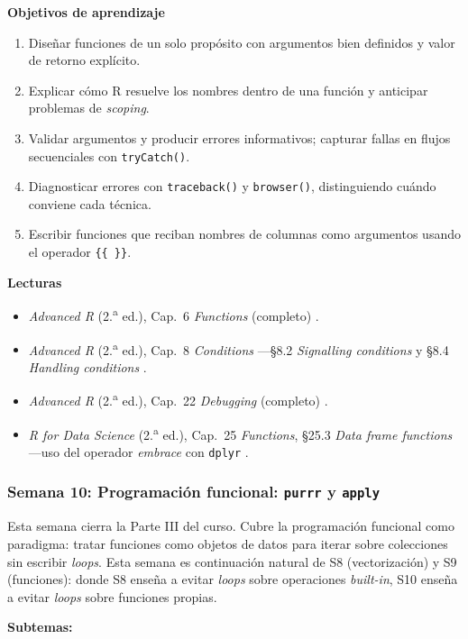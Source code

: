 \documentclass[11pt,letterpaper]{article}
\newcommand{\blue}[1]{{\color{cerulean}#1}}
\newcommand{\semana}[2]{%
  \subsubsection*{\color{main}Semana #1: #2}%
}
\begin{document}
\medskip
\noindent\textbf{Objetivos de aprendizaje}
\begin{enumerate}[leftmargin=*, itemsep=1pt]
    \item Diseñar funciones de un solo propósito con argumentos bien definidos y valor de retorno explícito.
    \item Explicar cómo R resuelve los nombres dentro de una función y anticipar problemas de \textit{scoping}.
    \item Validar argumentos y producir errores informativos; capturar fallas en flujos secuenciales con \texttt{tryCatch()}.
    \item Diagnosticar errores con \texttt{traceback()} y \texttt{browser()}, distinguiendo cuándo conviene cada técnica.
    \item Escribir funciones que reciban nombres de columnas como argumentos usando el operador \texttt{\{\{~\}\}}.
\end{enumerate}

\medskip
\noindent\textbf{Lecturas}
\begin{itemize}[leftmargin=*, itemsep=1pt]
    \item \textit{Advanced R} (2.\textsuperscript{a} ed.), Cap.\ 6 \textit{Functions} (completo) \cite{wickham2019advr}.
    \item \textit{Advanced R} (2.\textsuperscript{a} ed.), Cap.\ 8 \textit{Conditions} ---§8.2 \textit{Signalling conditions} y §8.4 \textit{Handling conditions} \cite{wickham2019advr}.
    \item \textit{Advanced R} (2.\textsuperscript{a} ed.), Cap.\ 22 \textit{Debugging} (completo) \cite{wickham2019advr}.
    \item \textit{R for Data Science} (2.\textsuperscript{a} ed.), Cap.\ 25 \textit{Functions}, §25.3 \textit{Data frame functions} ---uso del operador \textit{embrace} con \texttt{dplyr} \cite{wickham2023r4ds}.
\end{itemize}

\semana{10}{Programación funcional: \texttt{purrr} y \texttt{apply}}

Esta semana cierra la Parte III del curso. Cubre la \blue{programación funcional} como paradigma: tratar funciones como objetos de datos para iterar sobre colecciones sin escribir \textit{loops}. Esta semana es continuación natural de S8 (vectorización) y S9 (funciones): donde S8 enseña a evitar \textit{loops} sobre operaciones \textit{built-in}, S10 enseña a evitar \textit{loops} sobre funciones propias.

\textbf{Subtemas:}
\end{document}
